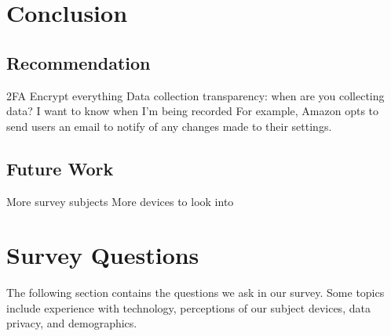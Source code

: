 \documentclass[12pt]{ucthesis}
\begin{document}
\chapter{Conclusion}
\label{ch:conclusion}

\section{Recommendation}
2FA
Encrypt everything
Data collection transparency: when are you collecting data? I want to know when I'm being recorded
For example, Amazon opts to send users an email to notify of any changes made to their settings. 

\section{Future Work}
More survey subjects
More devices to look into



\nocite{*}




\appendix
\chapter{Survey Questions}
\label{app:questions}
The following section contains the questions we ask in our survey. Some topics include experience with technology, perceptions of our subject devices, data privacy, and demographics.
\end{document}
